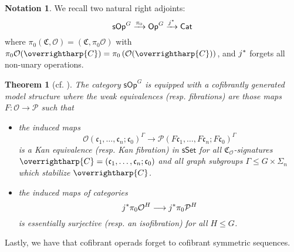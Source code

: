\documentclass[a4paper,10pt
,draft
]{article}%
\numberwithin{equation}{section}
\numberwithin{figure}{section}
\newtheorem{theorem}[equation]{Theorem}%
\theoremstyle{definition} %
\newtheorem{notation}[equation]{Notation}%
\newcommand{\longto}{\longrightarrow}%
\newcommand{\vect}[1]{\text{\overrightharp{\ensuremath{#1}}}}
\newcommand{\sSet}{\ensuremath{\mathsf{sSet}}}%
\newcommand{\Cat}{\mathsf{Cat}}
\newcommand{\Op}{\mathsf{Op}}%
\newcommand{\sOp}{\ensuremath{\mathsf{sOp}}}%
\newcommand{\sSym}{\ensuremath{\mathsf{sSym}}}%
\DeclareMathOperator{\Aut}{Aut}%
\renewcommand{\O}{\ensuremath{\mathcal O}}
\renewcommand{\P}{\ensuremath{\mathcal P}}
\newcommand{\1}{\ensuremath{\mathbbm 1}}%
\begin{document}

\begin{notation}
      We recall two natural right adjoints:
      \[
            \sOp^G \xrightarrow{\pi_0}
            \Op^G \xrightarrow{j^{\**}}
            \Cat
      \]
      where $\pi_0(\mathfrak C, \O) = (\mathfrak C, \pi_0 \O)$ with $\pi_0\O(\vect C) = \pi_0\left(\O(\vect C)\right)$,
      and $j^{\**}$ forgets all non-unary operations.
\end{notation}

\begin{theorem}[{cf. \cite[Thm. III, Prop. 4.78]{BP_HGOP}}] %
      The category $\sOp^G$ is equipped with a cofibrantly generated model structure where the weak equivalences (resp. fibrations) are those maps
      $F \colon \O \to \P$ such that
      \begin{itemize}
      \item the induced maps
            \begin{equation}
                  \label{DKEQUIV_EQ}
                  \O(\mathfrak c_1, \dots, \mathfrak c_n; \mathfrak c_0)^\Gamma \longto \P(F \mathfrak c_1, \dots, F \mathfrak c_n; F \mathfrak c_0)^\Gamma
            \end{equation}
            is a Kan equivalence (resp. Kan fibration) in $\sSet$
            for all $\mathfrak C_\O$-signatures $\vect C = (\mathfrak c_1, \dots, \mathfrak c_n; \mathfrak c_0)$
            and all \textit{graph subgroups} $\Gamma \leq G \times \Sigma_n$ which stabilize $\vect C$.
      \item the induced maps of categories
            \[
                  j^{\**}\pi_0 \O^H \longto j^{\**}\pi_0 \P^H
            \]
            is essentially surjective (resp. an isofibration) for all $H \leq G$.
      \end{itemize}
\end{theorem}


Lastly, we have that cofibrant operads forget to cofibrant symmetric sequences.
\end{document}

